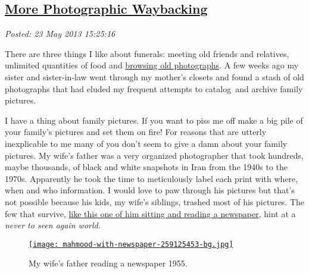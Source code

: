 %

\subsection*{\href{https://bakerjd99.wordpress.com/2013/05/23/more-photographic-waybacking/}{More Photographic Waybacking}}


\noindent\emph{Posted: 23 May 2013 15:25:16}
\vspace{6pt}

\captionsetup[figure]{labelformat=empty}

There are three things I like about funerals: meeting old friends and
relatives, unlimited quantities of food and
\href{http://bakerjd99.wordpress.com/2012/03/17/the-joys-of-photographic-waybacking/}{browsing
old photographs}. A few weeks ago my sister and sister-in-law went
through my mother's closets and found a stash of old photographs that
had eluded my frequent attempts to catalog~and archive family pictures.

I have a thing about family pictures. If you want to piss me off make a
big pile of your family's pictures and set them on fire! For reasons
that are utterly inexplicable to me many of you don't seem to give a
damn about your family pictures. My wife's father was a very organized
photographer that took hundreds, maybe thousands, of black and white
snapshots in Iran from the 1940s to the 1970s. Apparently he took the
time to meticulously label each print with where, when and who
information. I would love to paw through his pictures but that's not
possible because his kids, my wife's siblings, trashed most of his
pictures. The few that survive, \hyperlink{ht:4048X0}{like this one of him sitting and reading
a newspaper}, hint at a \emph{never to seen again world.}


\begin{figure}[htbp]
\centering
\hypertarget{ht:4048X0}{}
\href{http://conceptcontrol.smugmug.com/People/My-Wifes-Family/7081266\_Gq5ZQB\#!i=473480027\&k=f2jN5SP\&lb=1\&s=A}{\texttt{[image: mahmood-with-newspaper-259125453-bg.jpg]}}
\caption{My wife's father reading a newspaper 1955.}
\label{fig:4048X0}
\end{figure}

